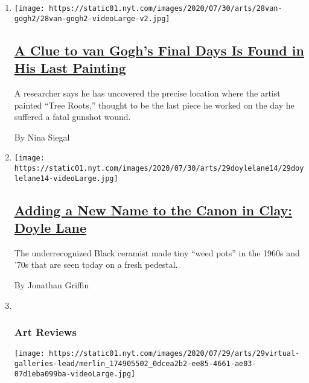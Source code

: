 \begin{enumerate}
\def\labelenumi{\arabic{enumi}.}
\item
  \texttt{[image: https://static01.nyt.com/images/2020/07/30/arts/28van-gogh2/28van-gogh2-videoLarge-v2.jpg]}

  \hypertarget{a-clue-to-van-goghs-final-days-is-found-in-his-last-painting}{%
  \subsection{\texorpdfstring{\href{/2020/07/28/arts/design/vincent-van-gogh-tree-roots.html}{A
  Clue to van Gogh's Final Days Is Found in His Last
  Painting}}{A Clue to van Gogh's Final Days Is Found in His Last Painting}}\label{a-clue-to-van-goghs-final-days-is-found-in-his-last-painting}}

  A researcher says he has uncovered the precise location where the
  artist painted ``Tree Roots,'' thought to be the last piece he worked
  on the day he suffered a fatal gunshot wound.

  By Nina Siegal
\item
  \texttt{[image: https://static01.nyt.com/images/2020/07/30/arts/29doylelane14/29doylelane14-videoLarge.jpg]}

  \hypertarget{adding-a-new-name-to-the-canon-in-clay-doyle-lane}{%
  \subsection{\texorpdfstring{\href{/2020/07/29/arts/design/doyle-lane-ceramics.html}{Adding
  a New Name to the Canon in Clay: Doyle
  Lane}}{Adding a New Name to the Canon in Clay: Doyle Lane}}\label{adding-a-new-name-to-the-canon-in-clay-doyle-lane}}

  The underrecognized Black ceramist made tiny ``weed pots'' in the
  1960s and '70s that are seen today on a fresh pedestal.

  By Jonathan Griffin
\item ~
  \hypertarget{art-reviews}{%
  \subsubsection{Art Reviews}\label{art-reviews}}

  \texttt{[image: https://static01.nyt.com/images/2020/07/29/arts/29virtual-galleries-lead/merlin\_174905502\_0dcea2b2-ee85-4661-ae03-07d1eba099ba-videoLarge.jpg]}

  \hypertarget{three-art-gallery-shows-to-see-right-now}{%
}
\end{enumerate}
